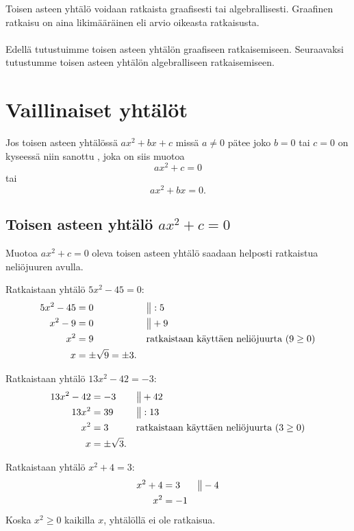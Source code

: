 Toisen asteen yhtälö voidaan ratkaista graafisesti tai algebrallisesti. Graafinen ratkaisu on aina likimääräinen eli arvio oikeasta ratkaisusta. \\ \\ Edellä tutustuimme toisen asteen yhtälön graafiseen ratkaisemiseen. Seuraavaksi tutustumme toisen asteen yhtälön algebralliseen ratkaisemiseen.
\section{Vaillinaiset yhtälöt}
Jos toisen asteen yhtälössä $ax^2+bx+c$ missä $a\neq 0$ pätee joko $b = 0$ tai
$c = 0$ on kyseessä niin sanottu , joka on
siis muotoa
\[ax^2+c=0\]
tai
\[ax^2+bx=0.\]
\subsection*{Toisen asteen yhtälö $ax^2+c=0$}
Muotoa $ax^2+c = 0$ oleva toisen asteen yhtälö saadaan helposti ratkaistua neliöjuuren avulla.

\begin{esimerkki}
Ratkaistaan yhtälö $5x^2-45=0$:
\begin{align*}
5x^2-45 &= 0 &&\big\| : 5 \\
x^2-9 &= 0 &&\big\| + 9 \\
x^2 &= 9 &&\text{ratkaistaan käyttäen neliöjuurta ($9 \geq 0$)} \\
x &= \pm \sqrt{9} = \pm 3.
\end{align*}
\end{esimerkki}

\begin{esimerkki}
Ratkaistaan yhtälö $13x^2-42=-3$:
\begin{align*}
13x^2-42 &= -3 &&\big\| + 42 \\
13x^2 &= 39 &&\big\| : 13 \\
x^2 &= 3 &&\text{ratkaistaan käyttäen neliöjuurta ($3 \geq 0$)} \\
x &= \pm \sqrt{3}.
\end{align*}
\end{esimerkki}

\begin{esimerkki}
Ratkaistaan yhtälö $x^2+4=3$:
\begin{align*}
x^2+4 &= 3 &&\big\| - 4 \\
x^2 &= -1
\end{align*}
Koska $x^2 \geq 0$ kaikilla $x$, yhtälöllä ei ole ratkaisua.
\end{esimerkki}

